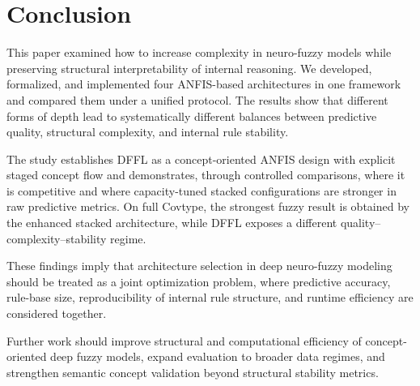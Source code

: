 \documentclass[runningheads]{llncs}
\begin{document}
\section{Conclusion}

This paper examined how to increase complexity in neuro-fuzzy models while preserving structural interpretability of internal reasoning. We developed, formalized, and implemented four ANFIS-based architectures in one framework and compared them under a unified protocol. The results show that different forms of depth lead to systematically different balances between predictive quality, structural complexity, and internal rule stability.

The study establishes DFFL as a concept-oriented ANFIS design with explicit staged concept flow and demonstrates, through controlled comparisons, where it is competitive and where capacity-tuned stacked configurations are stronger in raw predictive metrics. On full Covtype, the strongest fuzzy result is obtained by the enhanced stacked architecture, while DFFL exposes a different quality--complexity--stability regime.

These findings imply that architecture selection in deep neuro-fuzzy modeling should be treated as a joint optimization problem, where predictive accuracy, rule-base size, reproducibility of internal rule structure, and runtime efficiency are considered together.

Further work should improve structural and computational efficiency of concept-oriented deep fuzzy models, expand evaluation to broader data regimes, and strengthen semantic concept validation beyond structural stability metrics.



\end{document}
